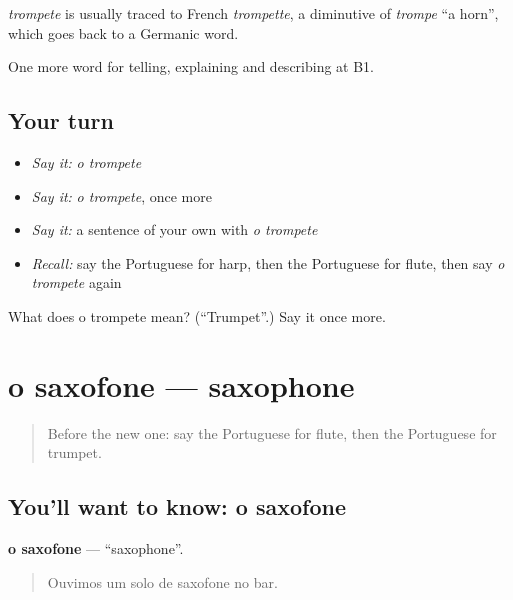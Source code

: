 \begin{cousinweb}
\emph{trompete} is usually traced to French \emph{trompette}, a diminutive of \emph{trompe} \textquotedblleft{}a horn\textquotedblright{}, which goes back to a Germanic word.
\end{cousinweb}

\begin{grammarlens}[title={What you've built}]
One more word for telling, explaining and describing at B1.
\end{grammarlens}

\subsection*{Your turn}
\begin{itemize}
\raggedright
  \item \emph{Say it:} \emph{o trompete}
  \item \emph{Say it:} \emph{o trompete}, once more
  \item \emph{Say it:} a sentence of your own with \emph{o trompete}
  \item \emph{Recall:} say the Portuguese for harp, then the Portuguese for flute, then say \emph{o trompete} again
\end{itemize}

\begin{tcolorbox}[breakable,colback=teal!4,colframe=teal!35!black,title={Before you move on}]
What does o trompete mean? (\textquotedblleft{}Trumpet\textquotedblright{}.) Say it once more.
\end{tcolorbox}
\section[o saxofone]{o saxofone — saxophone}

\label{lesson:PT-C517-saxofone}



\begin{quote}
Before the new one: say the Portuguese for flute, then the Portuguese for trumpet.
\end{quote}

\subsection*{You'll want to know: o saxofone}
\textbf{o saxofone} — \textquotedblleft{}saxophone\textquotedblright{}.

\begin{quote}
Ouvimos um solo de saxofone no bar.
\end{quote}

